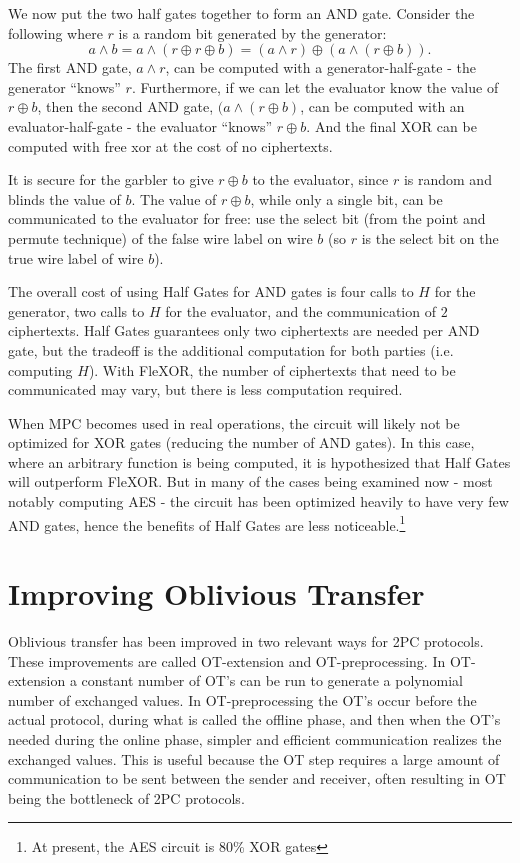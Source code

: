 We now put the two half gates together to form an AND gate. 
Consider the following where $r$ is a random bit generated by the generator:
\begin{equation}
    a \wedge b = a \wedge (r \oplus r \oplus b) = (a \wedge r) \oplus (a \wedge (r \oplus b)).
\end{equation}
The first AND gate, $a \wedge r$, can be computed with a generator-half-gate - the generator ``knows'' $r$. 
Furthermore, if we can let the evaluator know the value of $r \oplus b$, then the second AND gate, $(a \wedge (r \oplus b)$, can be computed with an evaluator-half-gate - the evaluator ``knows'' $r \oplus b$. 
And the final XOR can be computed with free xor at the cost of no ciphertexts. 

It is secure for the garbler to give $r \oplus b$ to the evaluator, since $r$ is random and blinds the value of $b$. 
The value of $r \oplus b$, while only a single bit, can be communicated to the evaluator for free: use the select bit (from the point and permute technique) of the false wire label on wire $b$ (so $r$ is the select bit on the true wire label of wire $b$).

The overall cost of using Half Gates for AND gates is four calls to $H$ for the generator, two calls to $H$ for the evaluator, and the communication of $2$ ciphertexts. 
Half Gates guarantees only two ciphertexts are needed per AND gate, but the tradeoff is the additional computation for both parties (i.e. computing $H$).
With FleXOR, the number of ciphertexts that need to be communicated may vary, but there is less computation required.

When MPC becomes used in real operations, the circuit will likely not be optimized for XOR gates (reducing the number of AND gates). 
In this case, where an arbitrary function is being computed, it is hypothesized that Half Gates will outperform FleXOR. 
But in many of the cases being examined now - most notably computing AES - the circuit has been optimized heavily to have very few AND gates, hence the benefits of Half Gates are less noticeable.\footnote{At present, the AES circuit is 80\% XOR gates} 

    \section{Improving Oblivious Transfer}
    Oblivious transfer has been improved in two relevant ways for 2PC protocols. 
    These improvements are called OT-extension and OT-preprocessing. 
    In OT-extension a constant number of OT's can be run to generate a polynomial number of exchanged values.
    In OT-preprocessing the OT's occur before the actual protocol, during what is called the offline phase, and then when the OT's needed during the online phase, simpler and efficient communication realizes the exchanged values.
    This is useful because the OT step requires a large amount of communication to be sent between the sender and receiver, often resulting in OT being the bottleneck of 2PC protocols.

